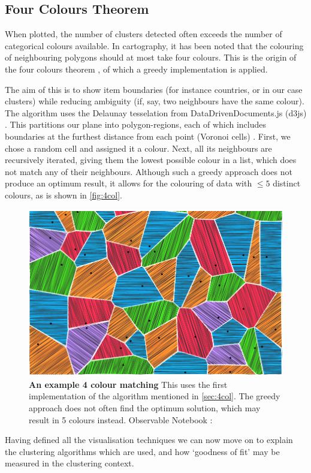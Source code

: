 \subsection{Four Colours Theorem}\label{sec:4col}
When plotted, the number of clusters detected often exceeds the number of categorical colours available. In cartography, it has been noted that the colouring of neighbouring polygons should at most take four colours. This is the origin of the four colours theorem \citep{fourcolour}, of which a greedy implementation is applied.

The aim of this is to show item boundaries (for instance countries, or in our case clusters) while reducing ambiguity (if, say, two neighbours have the same colour). The algorithm uses the Delaunay tesselation from DataDrivenDocuments.js (d3js) \citep{d3js}. This partitions our plane into polygon-regions, each of which includes boundaries at the furthest distance from each point (Voronoi cells) \citep{delaunay}. First, we chose a random cell and assigned it a colour.
Next, all its neighbours are recursively iterated, giving them the lowest possible colour in a list, which does not match any of their neighbours. Although such a greedy approach does not produce an optimum result, it allows for the colouring of data with $\le 5$ distinct colours, as is shown in \autoref{fig:4col}.


\begin{figure}[H]
  \centering
\includegraphics[width=.8\textwidth]{4fig/4col.png}
\caption{\textbf{An example 4 colour matching} This uses the first implementation of the algorithm mentioned in \autoref{sec:4col}. The greedy approach does not often find the optimum solution, which may result in 5 colours instead. Observable Notebook : \cite{w4colobs}}\label{fig:4col}
\end{figure}


Having defined all the visualisation techniques we can now move on to explain the clustering algorithms which are used, and how `goodness of fit' may be measured in the clustering context.

